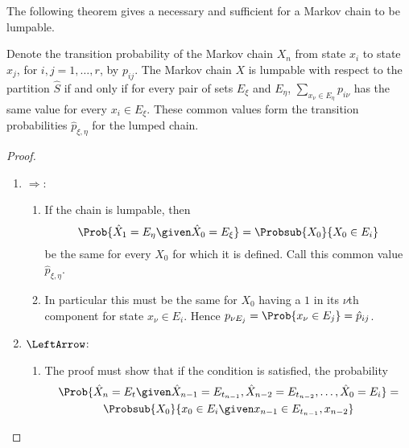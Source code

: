 \documentclass[12pt]{article}
\begin{document}
The following theorem gives a necessary and sufficient for a Markov
chain to be lumpable.

\begin{theorem}
    Denote the transition probability of the Markov chain \( X_n \) from
    state \( x_i \) to state \( x_j \), for \( i, j = 1, \dots, r \), by
    \( p_{ij} \).   The Markov
    chain \( X \) is lumpable with respect to the partition \( \hat{S} \)
    if and only if for every pair of sets \( E_{\xi} \) and \( E_{\eta} \), \( \sum_{x_{\nu}
    \in E_{\eta}} p_{i\nu} \) has the same value for every \( x_i \in E_{\xi} \).
    These common values form the transition probabilities \( \hat{p}_{\xi,\eta}
    \) for the lumped chain.
\end{theorem}

\begin{proof}
    \begin{enumerate}
        \item
            \( \Rightarrow \):
            \begin{enumerate}
                \item
                    If the chain is lumpable, then
                    \[
                        \Prob{\hat{X}_1 = E_{\eta} \given \hat{X}_0 = E_{\xi}} =
                        \Probsub{X_0}{X_0 \in E_i }
                    \] be the same for every \( X_0 \) for which it is
                    defined.  Call this common value \( \hat{p}_{\xi,\eta} \).
                \item
                    In particular this must be the same for \( X_0 \)
                    having a \( 1 \) in its \( \nu \)th component for
                    state \( x_{\nu} \in E_i \). Hence \( p_{\nu E_j} = \Prob{x_{\nu}
                    \in E_j} = \hat{p}_{ij} \).
            \end{enumerate}
        \item
            \( \LeftArrow \):
            \begin{enumerate}
                \item
                    The proof must show that if the condition is
                    satisfied, the probability
                    \begin{multline*}
                        \Prob{\hat{X}_n = E_t \given \hat{X}_{n-1} = E_{t_
                        {n-1}}, \hat{X}_{n-2} = E_{t_{n-2}}, \dots, \hat{X}_0 = E_i} = \\
                    \Probsub{X_0}
                        {x_0 \in E_i \given x_{n-1} \in E_{t_{n-1}}, x_{n-2}
}
\end{multline*}
\end{enumerate}
\end{enumerate}
\end{proof}
\end{document}
